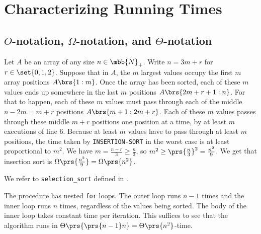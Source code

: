 \documentclass[oneside]{scrbook}
\newcommand{\codeword}[1]{\texttt{#1}}
\theoremstyle{definition}
\begin{document}
\chapter{Characterizing Running Times}

\section{$O$-notation, $\Omega$-notation, and $\Theta$-notation}

\begin{exercise}
    Let $A$ be an array of any size $n \in \mbb{N}_+$.
    Write $n = 3m + r$ for $r \in \set{0,1,2}$.
    Suppose that in $A$, the $m$ largest values occupy the first $m$ array positions $A\brs{1 : m}$. Once the array has been sorted, each of these $m$ values ends up somewhere in the last $m$ positions $A\brs{2m+r+1 : n}$. For that to happen, each of these $m$ values must pass through each of the middle $n - 2m = m + r$ positions $A\brs{m+1 : 2m+r}$. Each of these $m$ values passes through these middle $m+r$ positions one position at a time, by at least $m$ executions of line $6$. Because at least $m$ values have to pass through at least $m$ positions, the time taken by \codeword{INSERTION-SORT} in the worst case is at least proportional to $m^2$. We have $m = \frac{n-r}{3} \geq \frac{n}{3}$, so $m^2 \geq \prs{\frac{n}{3}}^2 = \frac{n^2}{9}$. We get that insertion sort is $\Omega\prs{\frac{n^2}{9}} = \Omega\prs{n^2}$.
\end{exercise}

\begin{exercise}
    We refer to \codeword{selection\_sort} defined in .

    The procedure has nested \codeword{for} loops. The outer loop runs $n-1$ times and the inner loop runs $n$ times, regardless of the values being sorted. The body of the inner loop takes constant time per iteration. This suffices to see that the algorithm runs in $\Theta\prs{\prs{n-1}n} = \Theta\prs{n^2}$-time.
\end{exercise}
\end{document}
